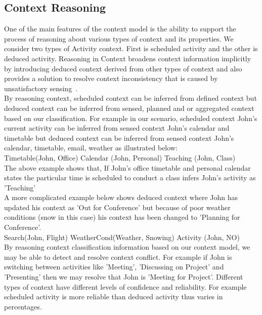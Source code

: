 \documentclass[copyright,creativecommons,noderivs,noncommercial]{eptcs}
\begin{document}
\subsection{Context Reasoning}
One of the main features of the context model is the ability to support the process of reasoning about various types of context and its properties. We consider two types of Activity context. First is scheduled activity and the other is deduced activity. Reasoning in Context broadens context information implicitly by introducing deduced context derived from other types of context and also provides a solution to resolve context inconsistency that is caused by unsatisfactory sensing~\cite{k12}.\\
By reasoning context, scheduled context can be inferred from defined context but deduced context can be inferred from sensed, planned and or aggregated context based on our classification. For example in our scenario, scheduled context John's current activity can be inferred from sensed context John's calendar and timetable but deduced context can be inferred from sensed context John's calendar, timetable, email, weather as illustrated below:\\

Timetable(John, Office)   Calendar (John, Personal)  Teaching (John, Class)\\

\noindent The above example shows that, If John's office timetable and personal calendar states the particular time is scheduled to conduct a class infers John's activity as 'Teaching'\\
A more complicated example below shows deduced context where John has updated his context as 'Out for Conference' but because of poor weather conditions (snow in this case) his context has been changed to 'Planning for Conference'.\\

Search(John, Flight)   WeatherCond(Weather, Snowing)  Activity (John, NO)\\

\noindent By reasoning context classification information based on our context model, we may be able to detect and resolve context conflict. For example if John is switching between activities like 'Meeting', 'Discussing on Project' and 'Presenting' then we may resolve that John is 'Meeting for Project'. Different types of context have different levels of confidence and reliability. For example scheduled activity is more reliable than deduced activity thus varies in percentages.
\end{document}
